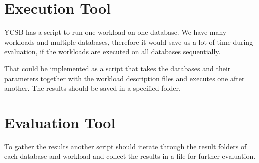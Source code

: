 \section{Execution Tool}
\label{ch:design:se:executionTool}
YCSB has a script to run one workload on one database.
We have many workloads and multiple databases,
therefore it would save us a lot of time during evaluation,
if the workloads are executed on all databases sequentially.

That could be implemented as a script that takes the databases and their parameters together with the workload description files and executes one after another.
The results should be saved in a specified folder.

\section{Evaluation Tool}
\label{ch:design:se:evaluationTool}
To gather the results another script should iterate through the result folders of each database and workload and collect the results in a file for further evaluation.
